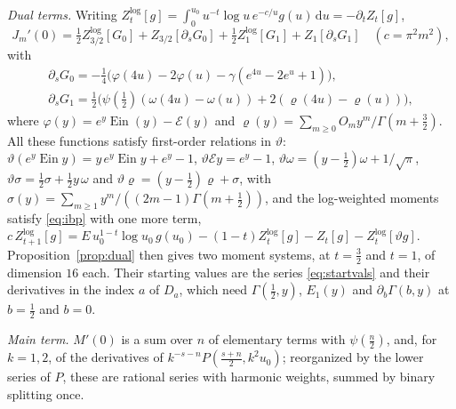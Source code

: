 \documentclass[11pt,reqno]{amsart}
\theoremstyle{definition}
\theoremstyle{remark}
\newcommand{\Ein}{\operatorname{Ein}}
\newcommand{\Eip}{\mathcal{E}}
\newcommand{\dd}{\,\mathrm{d}}
\begin{document}
\emph{Dual terms.} Writing $Z^{\log}_t[g] = \int_0^{u_0}u^{-t}\log u\,e^{-c/u}g(u)\dd u = -\partial_tZ_t[g]$,
\[
  J_m'(0) = \tfrac12Z^{\log}_{3/2}[G_0] + Z_{3/2}[\partial_sG_0] + \tfrac12Z^{\log}_1[G_1] + Z_1[\partial_sG_1]
  \quad (c = \pi^2m^2),
\]
with
\begin{gather*}
  \partial_sG_0 = -\tfrac14\bigl(\varphi(4u) - 2\varphi(u) - \gamma(e^{4u} - 2e^u + 1)\bigr), \\
  \partial_sG_1 = \tfrac12\bigl(\psi(\tfrac12)(\omega(4u) - \omega(u)) + 2(\varrho(4u) - \varrho(u))\bigr),
\end{gather*}
where $\varphi(y) = e^y\Ein(y) - \Eip(y)$ and $\varrho(y) = \sum_{m\ge0}O_my^m/\Gamma(m+\frac32)$.
All these functions satisfy first-order relations in $\vartheta$: $\vartheta(e^y\Ein y) = y\,e^y\Ein y + e^y - 1$,
$\vartheta\Eip y = e^y - 1$, $\vartheta\omega = (y - \frac12)\omega + 1/\sqrt\pi$, $\vartheta\sigma = \frac12\sigma +
\frac12y\,\omega$ and $\vartheta\varrho = (y - \frac12)\varrho + \sigma$, with
$\sigma(y) = \sum_{m\ge1}y^m/((2m-1)\Gamma(m+\frac12))$, and the log-weighted moments satisfy \eqref{eq:ibp} with one
more term, $c\,Z^{\log}_{t+1}[g] = E\,u_0^{1-t}\log u_0\,g(u_0) - (1-t)Z^{\log}_t[g] - Z_t[g] - Z^{\log}_t[\vartheta g]$.
Proposition~\ref{prop:dual} then gives two moment systems, at $t = \frac32$ and $t = 1$, of dimension $16$ each. Their
starting values are the series \eqref{eq:startvals} and their derivatives in the index $a$ of $D_a$, which need
$\Gamma(\frac12,y)$, $E_1(y)$ and $\partial_b\Gamma(b,y)$ at $b = \frac12$ and $b = 0$.

\emph{Main term.} $M'(0)$ is a sum over $n$ of elementary terms with $\psi(\frac n2)$, and, for $k = 1, 2$, of the
derivatives of $k^{-s-n}P(\frac{s+n}2,k^2u_0)$; reorganized by the lower series of $P$, these are rational series with
harmonic weights, summed by binary splitting once.
\end{document}
